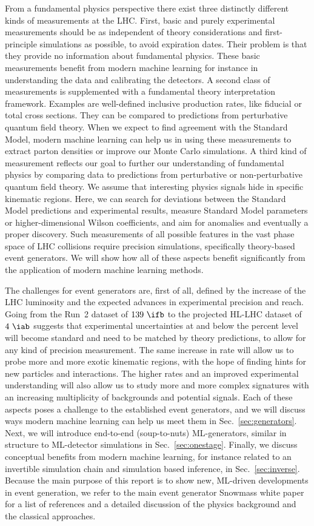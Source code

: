 \documentclass[submission,Phys]{SciPost}
\begin{document}
From a fundamental physics perspective there exist three distinctly different kinds of measurements at the LHC. First, basic and purely experimental measurements should be as independent of theory considerations and first-principle simulations as possible, to avoid expiration dates. Their problem is that they provide no information about fundamental physics. These basic measurements benefit from modern machine learning for instance in understanding the data and calibrating the detectors. A second class of measurements is supplemented with a fundamental theory interpretation framework. Examples are well-defined inclusive production rates, like fiducial or total cross sections. They can be compared to predictions from perturbative quantum field theory. When we expect to find agreement with the Standard Model, modern machine learning can help us in using these measurements to extract parton densities or improve our Monte Carlo simulations. A third kind of measurement reflects our goal to further our understanding of fundamental physics by comparing data to predictions from perturbative or non-perturbative quantum field theory. We assume that interesting physics signals hide in specific kinematic regions. Here, we can search for deviations between the Standard Model predictions and experimental results, measure Standard Model parameters or higher-dimensional Wilson coefficients, and aim for anomalies and eventually a proper discovery. Such measurements of all possible features in the vast phase space of LHC collisions require precision simulations, specifically theory-based event generators. We will show how all of these aspects benefit significantly from the application of modern machine learning methods.

The challenges for event generators are, first of all, defined by the increase of the LHC luminosity and the expected advances in experimental precision and reach. Going from the Run~2 dataset of $139~\ifb$ to the projected HL-LHC dataset of $4~\iab$ suggests that experimental uncertainties at and below the percent level will become standard and need to be matched by theory predictions, to allow for any kind of precision measurement. The same increase in rate will allow us to probe more and more exotic kinematic regions, with the hope of finding hints for new particles and interactions. The higher rates and an improved experimental understanding will also allow us to study more and more complex signatures with an increasing multiplicity of backgrounds and potential signals. Each of these aspects poses a challenge to the established event generators, and we will discuss ways modern machine learning can help us meet them in Sec.~\ref{sec:generators}. Next, we will introduce end-to-end (soup-to-nuts) ML-generators, similar in structure to ML-detector simulations in Sec.~\ref{sec:onestage}. Finally, we discuss conceptual benefits from modern machine learning, for instance related to an invertible simulation chain and simulation based inference, in Sec.~\ref{sec:inverse}. Because the main purpose of this report is to show new, ML-driven developments in event generation, we refer to the main event generator Snowmass white paper for a list of references and a detailed discussion of the physics background and the classical approaches.
\end{document}
